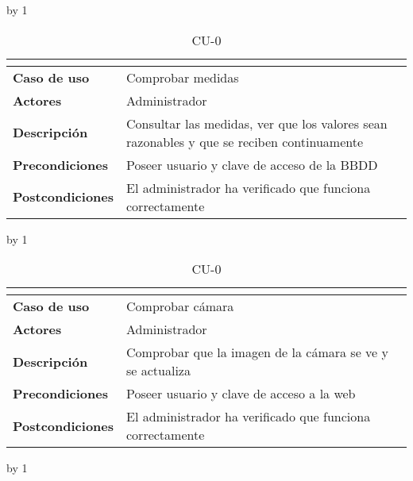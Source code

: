 \advance\cu by 1
\begin{table}[H]
	\centering
	\caption{CU-0\number\cu}
	\begin{tabular}{|l|p{}|}
		\hline
		\multicolumn{2}{|c|}{\cellcolor[HTML]{BFBFBF}{\color[HTML]{000000} \textbf{CU-0\number\cu}}} \\ \hline
		\textbf{Caso de uso}     & Comprobar medidas                                                                         \\ \hline
		\textbf{Actores}         & Administrador                                                                             \\ \hline
		\textbf{Descripción}     & Consultar las medidas, ver que los valores sean razonables y que se reciben continuamente \\ \hline
		\textbf{Precondiciones}  & Poseer usuario y clave de acceso de la BBDD                                               \\ \hline
		\textbf{Postcondiciones} & El administrador ha verificado que funciona correctamente                                 \\ \hline
	\end{tabular}
\end{table}
\advance\cu by 1
\begin{table}[H]
	\centering
	\caption{CU-0\number\cu}
	\begin{tabular}{|l|p{}|}
		\hline
		\multicolumn{2}{|c|}{\cellcolor[HTML]{BFBFBF}{\color[HTML]{000000} \textbf{CU-0\number\cu}}} \\ \hline
		\textbf{Caso de uso}     & Comprobar cámara                                          \\ \hline
		\textbf{Actores}         & Administrador                                             \\ \hline
		\textbf{Descripción}     & Comprobar que la imagen de la cámara se ve y se actualiza \\ \hline
		\textbf{Precondiciones}  & Poseer usuario y clave de acceso a la web                 \\ \hline
		\textbf{Postcondiciones} & El administrador ha verificado que funciona correctamente \\ \hline
	\end{tabular}
\end{table}
\advance\cu by 1
